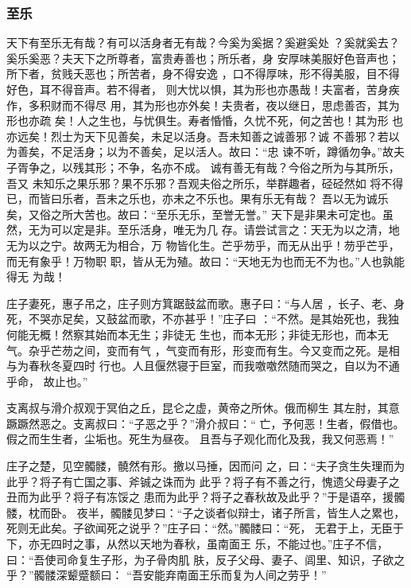 \documentclass[]{article}
\begin{document}
\hypertarget{header-n2213}{%
\subsubsection{至乐}\label{header-n2213}}

天下有至乐无有哉？有可以活身者无有哉？今奚为奚据？奚避奚处
？奚就奚去？奚乐奚恶？夫天下之所尊者，富贵寿善也；所乐者，身
安厚味美服好色音声也；所下者，贫贱夭恶也；所苦者，身不得安逸
，口不得厚味，形不得美服，目不得好色，耳不得音声。若不得者，
则大忧以惧，其为形也亦愚哉！夫富者，苦身疾作，多积财而不得尽
用，其为形也亦外矣！夫贵者，夜以继日，思虑善否，其为形也亦疏
矣！人之生也，与忧俱生。寿者惛惛，久忧不死，何之苦也！其为形
也亦远矣！烈士为天下见善矣，未足以活身。吾未知善之诚善邪？诚
不善邪？若以为善矣，不足活身；以为不善矣，足以活人。故曰：``忠
谏不听，蹲循勿争。''故夫子胥争之，以残其形；不争，名亦不成。
诚有善无有哉？今俗之所为与其所乐，吾又
未知乐之果乐邪？果不乐邪？吾观夫俗之所乐，举群趣者，硁硁然如
将不得已，而皆曰乐者，吾未之乐也，亦未之不乐也。果有乐无有哉？
吾以无为诚乐矣，又俗之所大苦也。故曰：``至乐无乐，至誉无誉。''
天下是非果未可定也。虽然，无为可以定是非。至乐活身，唯无为几
存。请尝试言之：天无为以之清，地无为以之宁。故两无为相合，万
物皆化生。芒乎芴乎，而无从出乎！芴乎芒乎，而无有象乎！万物职
职，皆从无为殖。故曰：``天地无为也而无不为也。''人也孰能得无 为哉！

庄子妻死，惠子吊之，庄子则方箕踞鼓盆而歌。惠子曰：``与人居
，长子、老、身死，不哭亦足矣，又鼓盆而歌，不亦甚乎！''庄子曰
：``不然。是其始死也，我独何能无概！然察其始而本无生；非徒无
生也，而本无形；非徒无形也，而本无气。杂乎芒芴之间，变而有气
，气变而有形，形变而有生。今又变而之死。是相与为春秋冬夏四时
行也。人且偃然寝于巨室，而我噭噭然随而哭之，自以为不通乎命， 故止也。''

支离叔与滑介叔观于冥伯之丘，昆仑之虚，黄帝之所休。俄而柳生
其左肘，其意蹶蹶然恶之。支离叔曰：``子恶之乎？''滑介叔曰：``
亡，予何恶！生者，假借也。假之而生生者，尘垢也。死生为昼夜。
且吾与子观化而化及我，我又何恶焉！''

庄子之楚，见空髑髅，髐然有形。撽以马捶，因而问
之，曰：``夫子贪生失理而为此乎？将子有亡国之事、斧铖之诛而为
此乎？将子有不善之行，愧遗父母妻子之丑而为此乎？将子有冻馁之
患而为此乎？将子之春秋故及此乎？''于是语卒，援髑髅，枕而卧。
夜半，髑髅见梦曰：``子之谈者似辩士，诸子所言，皆生人之累也，
死则无此矣。子欲闻死之说乎？''庄子曰：``然。''髑髅曰：``死，
无君于上，无臣于下，亦无四时之事，从然以天地为春秋，虽南面王
乐，不能过也。''庄子不信，曰：``吾使司命复生子形，为子骨肉肌
肤，反子父母、妻子、闾里、知识，子欲之乎？''髑髅深颦蹙额曰：
``吾安能弃南面王乐而复为人间之劳乎！''
\end{document}
